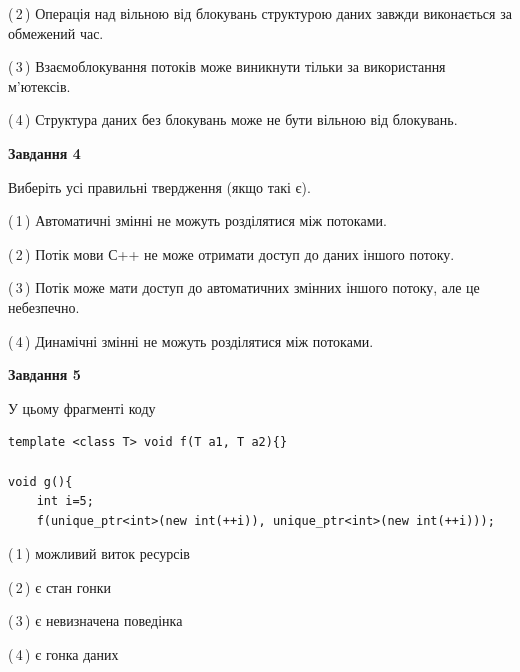 \documentclass[12pt, ukrainian]{article}
\begin{document}
\begin {large}
{(\,2\,) Операція над вільною від блокувань структурою даних завжди виконається за обмежений час.%

(\,3\,) Взаємоблокування потоків може виникнути тільки за використання м’ютексів.%

(\,4\,) Структура даних без блокувань може не бути вільною від блокувань.%



\begin{center}
\textbf{Завдання 4}
\end{center}
Виберіть усі правильні твердження (якщо такі є).\par
\vspace{2mm}

(\,1\,) Автоматичні змінні не можуть розділятися між потоками.%

(\,2\,) Потік мови С++ не може отримати доступ до даних іншого потоку.%

(\,3\,) Потік може мати доступ до автоматичних змінних іншого потоку, але це небезпечно.%

(\,4\,) Динамічні змінні не можуть розділятися між потоками.%



\begin{center}
\textbf{Завдання 5}
\end{center}
У цьому фрагменті коду
\begin{verbatim}
template <class T> void f(T a1, T a2){}

void g(){
    int i=5;
    f(unique_ptr<int>(new int(++i)), unique_ptr<int>(new int(++i)));
\end{verbatim}

(\,1\,) можливий виток ресурсів%

(\,2\,) є стан гонки%

(\,3\,) є невизначена поведінка%

(\,4\,) є гонка даних%


}
\end {large}
\end{document}

